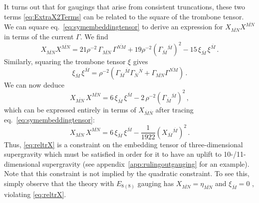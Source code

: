\documentclass[a4paper, 11pt]{article}
\numberwithin{equation}{section}
\newcommand{\ov}[1]{\overline{#1}}
\newcommand{\En}[1]{E_{#1(#1)}}
\newcommand{\+}{\oplus}
\newcommand{\fl}[1]{\ov{#1}}
\begin{document}
It turns out that for gaugings that arise from consistent truncations, these two terms \eqref{eq:ExtraX2Terms} can be related to the square of the trombone tensor. We can square eq.~\eqref{eq:symembeddingtensor} to derive an expression for $X_{\ov{MN}}X^{\ov{MN}}$ in terms of the current $\Gamma$. We find
\begin{equation}\label{eq:XXwitheta}
	X_{\ov{MN}}X^{\ov{MN}} = 21 \rho^{-2}\, \Gamma_{\ov{MN}}\, \Gamma^{\ov{NM}} + 19 \rho^{-2}\left(\Gamma_{\ov M}{}^{\ov M}\right)^2 - 15\, \xi_{\ov{M}}\, \xi^{\ov{M}} \,.
\end{equation}
Similarly, squaring the trombone tensor $\xi$ gives
\begin{equation}\label{eq:xixiwitheta}
	\xi_{\ov M}\,\xi^{\ov M}=\rho^{-2}\left(\Gamma_{\ov M}{}^{\ov M}\Gamma_{\ov N}{}^{\ov N}+\Gamma_{\ov{MN}}\Gamma^{\ov{NM}}\right) \,.
\end{equation}
We can now deduce
\begin{equation}
	X_{\ov{MN}} \,X^{\ov{MN}}= 6\, \xi_{\ov M} \, \xi^{\ov M} - 2\, \rho^{-2}\left(\Gamma_{\ov M}{}^{\ov M}\right)^2 \,,
\end{equation}
which can be expressed entirely in terms of $X_{\fl{M}\fl{N}}$ after tracing eq.~\eqref{eq:symembeddingtensor}:
\begin{equation}\label{eq:reltrX}
	X_{\ov{MN}}\,X^{\ov{MN}} = 6\, \xi_{\ov M}\, \xi^{\ov M} - \frac1{1922}\left(X_{\ov M}{}^{\ov M}\right)^2 \,. 
\end{equation}
Thus, \eqref{eq:reltrX} is a constraint on the embedding tensor of three-dimensional supergravity which must be satisfied in order for it to have an uplift to 10-/11-dimensional supergravity (see appendix~\ref{app:rulingoutgauging} for an example). Note that this constraint is not implied by the quadratic constraint. To see this, simply observe that the theory with $\En{8}$ gauging has $X_{\ov{MN}}=\eta_{\ov{MN}}$ and $\xi_{\fl{M}} = 0$ \cite{Nicolai:2000sc,Nicolai:2001sv}, violating \eqref{eq:reltrX}.
\end{document}
